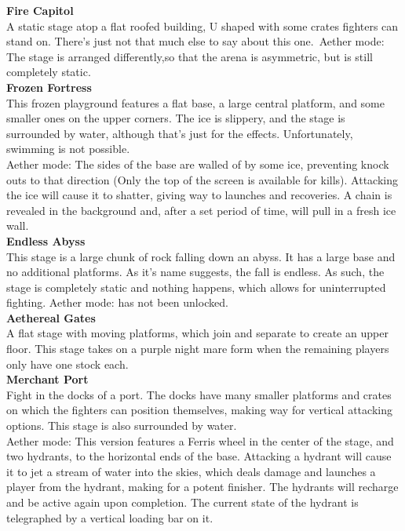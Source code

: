 \documentclass{article}
\begin{document}
\textbf{Fire Capitol}\\
A static stage atop a flat roofed building, U shaped with some crates fighters can stand on. There's just not that much else to say about this one.\
Aether mode: The stage is arranged differently,so that the arena is asymmetric, but is still completely static.\\
\textbf{Frozen Fortress}\\
This frozen playground features a flat base, a large central platform, and some smaller ones on the upper corners. The ice is slippery, and the stage is surrounded by water, although that's just for the effects. Unfortunately, swimming is not possible.\\
Aether mode: The sides of the base are walled of by some ice, preventing knock outs to that direction (Only the top of the screen is available for kills). Attacking the ice will cause it to shatter, giving way to launches and recoveries. A chain is revealed in the background and, after a set period of time, will pull in a fresh ice wall.
\\
\textbf{Endless Abyss}\\
This stage is a large chunk of rock falling down an abyss. It has a large base and no additional platforms. As it's name suggests, the fall is endless. As such, the stage is completely static and nothing happens, which allows for uninterrupted fighting.
Aether mode: has not been unlocked.%
\\
\textbf{Aethereal Gates}\\
A flat stage with moving platforms, which join and separate to create an upper floor. This stage takes on a purple night mare form when the remaining players only have one stock each.\\
\textbf{Merchant Port}\\
Fight in the docks of a port. The docks have many smaller platforms and crates on which the fighters can position themselves, making way for vertical attacking options. This stage is also surrounded by water.\\
Aether mode: This version features a Ferris wheel in the center of the stage, and two hydrants, to the horizontal ends of the base. Attacking a hydrant will cause it to jet a stream of water into the skies, which deals damage and launches a player from the hydrant, making for a potent finisher. The hydrants will recharge and be active again upon completion. The current state of the hydrant is telegraphed by a vertical loading bar on it.
\\
\end{document}

